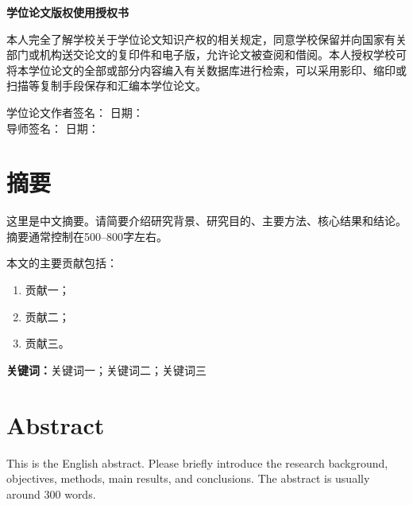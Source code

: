 \documentclass[12pt,a4paper,openright,UTF8]{ctexbook}
\begin{document}
\vspace{2cm}
\begin{center}
    {\bfseries 学位论文版权使用授权书}
\end{center}

\vspace{1cm}
本人完全了解学校关于学位论文知识产权的相关规定，同意学校保留并向国家有关部门或机构送交论文的复印件和电子版，允许论文被查阅和借阅。本人授权学校可将本学位论文的全部或部分内容编入有关数据库进行检索，可以采用影印、缩印或扫描等复制手段保存和汇编本学位论文。

\vspace{2cm}
\begin{flushright}
    学位论文作者签名：\underline{\hspace{4cm}} \quad 日期：\underline{\hspace{3cm}} \\[1cm]
    导师签名：\underline{\hspace{4.6cm}} \quad 日期：\underline{\hspace{3cm}}
\end{flushright}

\newpage
{}
\setcounter{page}{1}
\chapter*{摘\quad 要}

这里是中文摘要。请简要介绍研究背景、研究目的、主要方法、核心结果和结论。摘要通常控制在500--800字左右。

本文的主要贡献包括：
\begin{enumerate}[label=(\arabic*)]
    \item 贡献一；
    \item 贡献二；
    \item 贡献三。
\end{enumerate}

\vspace{1cm}
\noindent\textbf{关键词：}关键词一；关键词二；关键词三

\newpage
\chapter*{Abstract}

This is the English abstract. Please briefly introduce the research background, objectives, methods, main results, and conclusions. The abstract is usually around 300 words.
\end{document}
